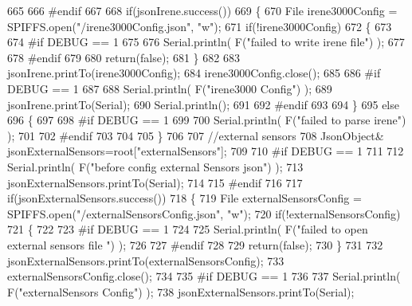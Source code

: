 \begin{DoxyCode}
665 
666 \textcolor{preprocessor}{#endif }
667 
668     \textcolor{keywordflow}{if}(jsonIrene.success())
669     \{
670         File irene3000Config = SPIFFS.open(\textcolor{stringliteral}{"/irene3000Config.json"}, \textcolor{stringliteral}{"w"});   
671         \textcolor{keywordflow}{if}(!irene3000Config)
672         \{
673 
674 \textcolor{preprocessor}{        #if DEBUG == 1 }
675 
676             Serial.println( F(\textcolor{stringliteral}{"failed to write irene file"}) );
677         
678 \textcolor{preprocessor}{        #endif}
679 
680             \textcolor{keywordflow}{return}(\textcolor{keyword}{false});
681         \}
682 
683         jsonIrene.printTo(irene3000Config);
684         irene3000Config.close();
685     
686 \textcolor{preprocessor}{    #if DEBUG == 1 }
687         
688         Serial.println( F(\textcolor{stringliteral}{"irene3000 Config"}) );
689         jsonIrene.printTo(Serial);
690         Serial.println();
691     
692 \textcolor{preprocessor}{    #endif}
693     
694     \}
695     \textcolor{keywordflow}{else}
696     \{
697     
698 \textcolor{preprocessor}{    #if DEBUG == 1 }
699 
700         Serial.println( F(\textcolor{stringliteral}{"failed to parse irene"}) );   
701     
702 \textcolor{preprocessor}{    #endif }
703 
704 
705     \}
706     
707     \textcolor{comment}{//external sensors}
708         JsonObject& jsonExternalSensors=root[\textcolor{stringliteral}{"externalSensors"}];
709 
710 \textcolor{preprocessor}{#if DEBUG == 1 }
711 
712     Serial.println( F(\textcolor{stringliteral}{"before config external Sensors json"}) );
713     jsonExternalSensors.printTo(Serial);
714 
715 \textcolor{preprocessor}{#endif}
716 
717     \textcolor{keywordflow}{if}(jsonExternalSensors.success())
718     \{
719         File externalSensorsConfig = SPIFFS.open(\textcolor{stringliteral}{"/externalSensorsConfig.json"}, \textcolor{stringliteral}{"w"});   
720         \textcolor{keywordflow}{if}(!externalSensorsConfig)
721         \{
722         
723 \textcolor{preprocessor}{        #if DEBUG == 1 }
724 
725             Serial.println( F(\textcolor{stringliteral}{"failed to open external sensors file "}) );
726         
727 \textcolor{preprocessor}{        #endif }
728 
729             \textcolor{keywordflow}{return}(\textcolor{keyword}{false});
730         \}
731 
732         jsonExternalSensors.printTo(externalSensorsConfig); 
733         externalSensorsConfig.close();
734 
735 \textcolor{preprocessor}{#if DEBUG == 1 }
736         
737         Serial.println( F(\textcolor{stringliteral}{"externalSensors Config"}) );
738         jsonExternalSensors.printTo(Serial);

\end{DoxyCode}
